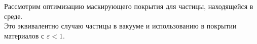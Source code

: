 \documentclass[14pt]{beamer}
\begin{document}
\begin{frame}
\small
\begin{center}
  Рассмотрим оптимизацию маскирующего покрытия для частицы,
  находящейся в среде.\\
  \vspace{1em}
  Это эквивалентно случаю частицы в вакууме и
  использованию в покрытии материалов с ${\varepsilon<1}$.
\end{center}
\end{frame}

\begin{frame}
\begin{center}
\small
  \begin{minipage}[ht]{0.49\linewidth}
  \end{minipage}
  \begin{minipage}[ht]{0.49\linewidth}

\end{minipage}
\end{center}
\end{frame}
\end{document}
